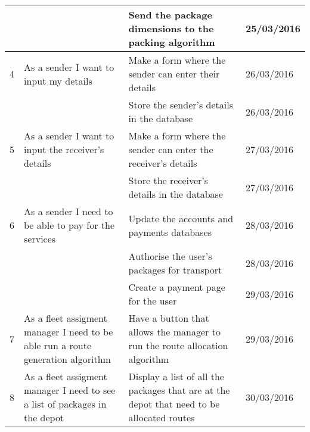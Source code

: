 \documentclass[paper=a4, fontsize=11pt]{scrartcl} %
\numberwithin{equation}{section} %
\numberwithin{figure}{section} %
\numberwithin{table}{section} %
\begin{document}
\begin{table}[!hbt]
\begin{tabular}{|p{1cm}|p{5cm}|p{5cm}|p{2cm}|}
            &                                                                                 & Send the package dimensions to the packing algorithm                                               & 25/03/2016    \\ \hline
4           & As a sender I want to input my details                                          & Make a form where the sender can enter their details                                               & 26/03/2016    \\ \hline
            &                                                                                 & Store the sender's details in the database                                                         & 26/03/2016    \\ \hline
5           & As a sender I want to input the receiver's details                              & Make a form where the sender can enter the receiver's details                                      & 27/03/2016    \\ \hline
            &                                                                                 & Store the receiver's details in the database                                                       & 27/03/2016    \\ \hline
6           & As a sender I need to be able to pay for the services                           & Update the accounts and payments databases                                                         & 28/03/2016    \\ \hline
            &                                                                                 & Authorise the user's packages for transport                                                        & 28/03/2016    \\ \hline
            &                                                                                 & Create a payment page for the user                                                                 & 29/03/2016    \\ \hline
7           & As a fleet assigment manager I need to be able run a route generation algorithm & Have a button that allows the manager to run the route allocation algorithm                        & 29/03/2016    \\ \hline
8           & As a fleet assigment manager I need to see a list of packages in the depot      & Display a list of all the packages that are at the depot that need to be allocated routes          & 30/03/2016    \\ \hline
\end{tabular}
\end{table}
\end{document}
